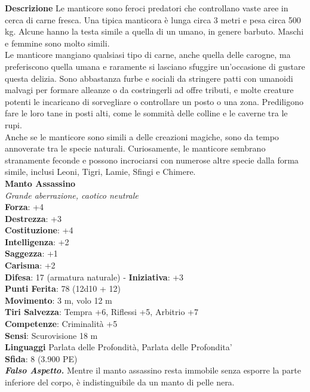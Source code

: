 \begin{multicols}{2}
\textbf{Descrizione}
Le manticore sono feroci predatori che controllano vaste aree in cerca di carne fresca. Una tipica manticora è lunga circa 3 metri e pesa circa 500 kg. Alcune hanno la testa simile a quella di un umano, in genere barbuto. Maschi e femmine sono molto simili.\\

Le manticore mangiano qualsiasi tipo di carne, anche quella delle carogne, ma preferiscono quella umana e raramente si lasciano sfuggire un’occasione di gustare questa delizia. Sono abbastanza furbe e sociali da stringere patti con umanoidi malvagi per formare alleanze o da costringerli ad offre tributi, e molte creature potenti le incaricano di sorvegliare o controllare un posto o una zona. Prediligono fare le loro tane in posti alti, come le sommità delle colline e le caverne tra le rupi.\\

Anche se le manticore sono simili a delle creazioni magiche, sono da tempo annoverate tra le specie naturali. Curiosamente, le manticore sembrano stranamente feconde e possono incrociarsi con numerose altre specie dalla forma simile, inclusi Leoni, Tigri, Lamie, Sfingi e Chimere.\\

\medskip\textbf{Manto Assassino}\\
\emph{Grande aberrazione, caotico neutrale}\\
\textbf{Forza}: +4\\
\textbf{Destrezza}: +3\\
\textbf{Costituzione}: +4\\
\textbf{Intelligenza}: +2\\
\textbf{Saggezza}: +1\\
\textbf{Carisma}: +2\\
\textbf{Difesa}: 17 (armatura naturale) - \textbf{Iniziativa}: +3\\
\textbf{Punti Ferita}: 78 (12d10 + 12)\\
\textbf{Movimento}: 3 m, volo 12 m\\
\textbf{Tiri Salvezza}: Tempra +6, Riflessi +5, Arbitrio +7\\
\textbf{Competenze}: Criminalità +5\\
\textbf{Sensi}: Scurovisione 18 m \\
\textbf{Linguaggi} Parlata delle Profondità, Parlata delle Profondita'\\
\textbf{Sfida}: 8 (3.900 PE)\smallskip\\
\emph{\textbf{Falso Aspetto.}} Mentre il manto assassino resta immobile senza esporre la parte inferiore del corpo, è indistinguibile da un manto di pelle nera.\\


\end{multicols}
